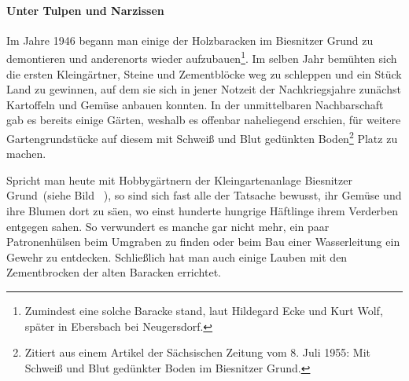 

\paragraph{Unter Tulpen und Narzissen}
Im Jahre 1946 begann man einige der Holzbaracken im Biesnitzer Grund zu demontieren und anderenorts wieder aufzubauen\footnote{Zumindest eine solche Baracke stand, laut Hildegard Ecke und Kurt Wolf, später in Ebersbach bei Neugersdorf.}. Im selben Jahr bemühten sich die ersten Kleingärtner, Steine und Zementblöcke weg zu schleppen und ein Stück Land zu gewinnen, auf dem sie sich in jener Notzeit der Nachkriegsjahre zunächst Kartoffeln und Gemüse anbauen konnten. In der unmittelbaren Nachbarschaft gab es bereits einige Gärten, weshalb es offenbar naheliegend erschien, für weitere Gartengrundstücke auf diesem mit \glqq Schweiß und Blut gedünkten Boden\grqq\footnote{Zitiert aus einem Artikel der Sächsischen Zeitung vom 8. Juli 1955: Mit Schweiß und Blut gedünkter Boden im Biesnitzer Grund.} Platz zu machen.

\newpage
Spricht man heute mit Hobbygärtnern der Kleingartenanlage \glqq Biesnitzer Grund\grqq~(siehe Bild ~), so sind sich fast alle der Tatsache bewusst, ihr Gemüse und ihre Blumen dort zu säen, wo einst hunderte hungrige Häftlinge ihrem Verderben entgegen sahen. So verwundert es manche gar nicht mehr, ein paar Patronenhülsen beim Umgraben zu finden oder beim Bau einer Wasserleitung ein Gewehr zu entdecken. Schließlich hat man auch einige Lauben mit den Zementbrocken der alten Baracken errichtet.



 